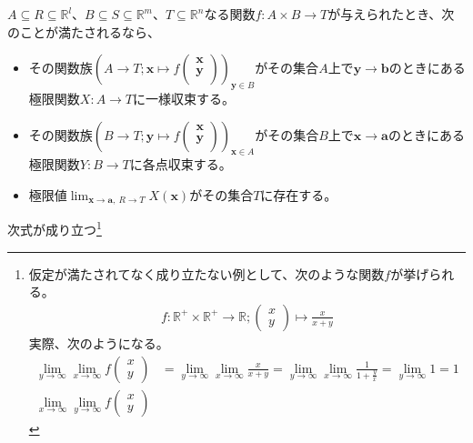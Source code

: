 \documentclass[dvipdfmx]{jsarticle}
\begin{document}
\begin{thm}\label{4.1.11.18}
$A \subseteq R \subseteq \mathbb{R}^{l}$、$B \subseteq S \subseteq \mathbb{R}^{m}$、$T \subseteq \mathbb{R}^{n}$なる関数$f:A \times B \rightarrow T$が与えられたとき、次のことが満たされるなら、
\begin{itemize}
\item
  その関数族$\left( A \rightarrow T;\mathbf{x} \mapsto f\begin{pmatrix}
  \mathbf{x} \\
  \mathbf{y} \\
  \end{pmatrix} \right)_{\mathbf{y} \in B}$がその集合$A$上で$\mathbf{y} \rightarrow \mathbf{b}$のときにある極限関数$X:A \rightarrow T$に一様収束する。
\item
  その関数族$\left( B \rightarrow T;\mathbf{y} \mapsto f\begin{pmatrix}
  \mathbf{x} \\
  \mathbf{y} \\
  \end{pmatrix} \right)_{\mathbf{x} \in A}$がその集合$B$上で$\mathbf{x} \rightarrow \mathbf{a}$のときにある極限関数$Y:B \rightarrow T$に各点収束する。
\item
  極限値$\lim_{\mathbf{x} \rightarrow \mathbf{a} ,\  R \rightarrow T }{X\left( \mathbf{x} \right)}$がその集合$T$に存在する。
\end{itemize}
次式が成り立つ\footnote{仮定が満たされてなく成り立たない例として、次のような関数$f$が挙げられる。
\begin{align*}
  f:\mathbb{R}^+ \times \mathbb{R}^+ \rightarrow \mathbb{R} ;\begin{pmatrix}
    x \\ y
  \end{pmatrix} \mapsto \frac{x}{x+y}
\end{align*}
実際、次のようになる。
\begin{align*}
  \lim_{y\rightarrow \infty } \lim_{x\rightarrow \infty } f\begin{pmatrix}
    x \\ y
  \end{pmatrix} &= \lim_{y\rightarrow \infty } \lim_{x\rightarrow \infty } \frac{x}{x+y} = \lim_{y\rightarrow \infty } \lim_{x\rightarrow \infty } \frac{1}{1+\frac{y}{x}} = \lim_{y\rightarrow \infty } 1 =1 \\
  \lim_{x\rightarrow \infty } \lim_{y\rightarrow \infty } f\begin{pmatrix}
    x \\ y

\end{pmatrix}
\end{align*}}
\end{thm}
\end{document}
